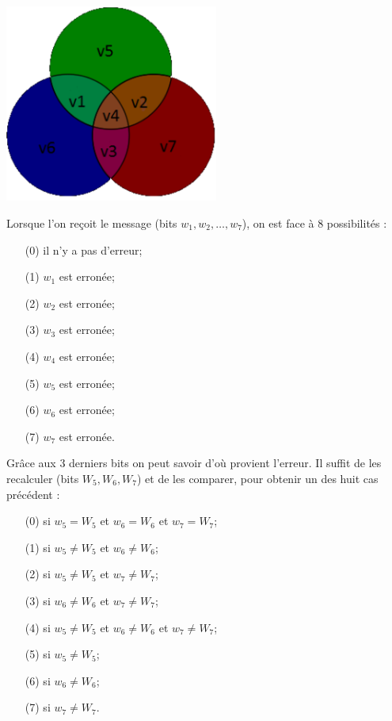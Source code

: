 \documentclass[12pt]{article}
\begin{document}
\linebreak
\\
\includegraphics[width=7cm]{cercles.PNG}


Lorsque l'on reçoit le message (bits $w_1, w_2, \ldots, w_7$), on est face à 8 possibilités :

\begin{enumerate}
  \item[(0)] il n'y a pas d'erreur;
  \item[(1)] $w_1$ est erronée;
  \item[(2)] $w_2$ est erronée;
  \item[(3)] $w_3$ est erronée;
  \item[(4)] $w_4$ est erronée;
  \item[(5)] $w_5$ est erronée;
  \item[(6)] $w_6$ est erronée;
  \item[(7)] $w_7$ est erronée.
\end{enumerate}

Grâce aux 3 derniers bits on peut savoir d'où provient l'erreur. Il suffit de les recalculer (bits $W_5, W_6, W_7$) et de les comparer, pour obtenir un des huit cas précédent :

\begin{enumerate}
  \item[(0)] si $w_5 = W_5$ et $w_6 = W_6$ et $w_7 = W_7$;
  \item[(1)] si $w_5 \ne W_5$ et $w_6 \ne W_6$;
  \item[(2)] si $w_5 \ne W_5$ et $w_7 \ne W_7$;
  \item[(3)] si $w_6 \ne W_6$ et $w_7 \ne W_7$;
  \item[(4)] si $w_5 \ne W_5$ et $w_6 \ne W_6$ et $w_7 \ne W_7$;
  \item[(5)] si $w_5 \ne W_5$;
  \item[(6)] si $w_6 \ne W_6$;
  \item[(7)] si $w_7 \ne W_7$.
\end{enumerate}
\end{document}
